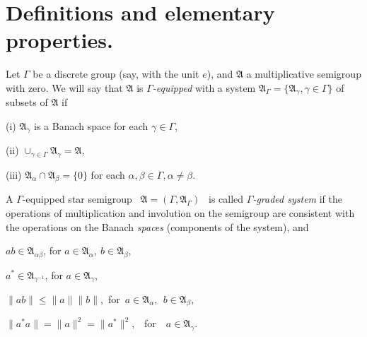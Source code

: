 \documentclass[
11pt,%
tightenlines,%
twoside,%
onecolumn,%
nofloats,%
nobibnotes,%
nofootinbib,%
superscriptaddress,%
noshowpacs,%
centertags]%
{revtex4}
\begin{document}
\section{Definitions and elementary properties.}

Let  $\Gamma$  be a discrete group (say, with the unit   $e$), and   $\mathfrak A$    a multiplicative semigroup with zero. We will say that
 $\mathfrak A$  is   {\em $\Gamma$-equipped} with a system   $\mathfrak A_\Gamma  = \{\mathfrak A_\gamma, \gamma\in\Gamma\}$   of subsets of  $\mathfrak A$  if

\medskip(i) $\mathfrak A_\gamma$  is a Banach space for each  $\gamma\in\Gamma$,

\medskip(ii) $\cup_{\gamma\in\Gamma}{\mathfrak A_\gamma} = {\mathfrak A}$,

\medskip(iii) ${\mathfrak A}_\alpha\cap {\mathfrak A}_\beta  =  \{0\}$ for each $\alpha, \beta\in\Gamma, \alpha\neq\beta$.

\begin{definition}\label{graded-system}  A  $\Gamma$-equipped star semigroup \ ${\mathfrak A} = (\Gamma, {\mathfrak A}_\Gamma)$ \ is called {\em $\Gamma$-graded system}
if the operations of multiplication and involution on the semigroup are consistent with the operations on the Banach {\em spaces} (components of the system), and

   $ab\in{\mathfrak A}_{\alpha \beta}$,    for $a\in    {\mathfrak  A}_\alpha,\   b\in {\mathfrak   A}_\beta,$

  $a^*\in {\mathfrak A}_{\gamma^{-1}}$,  for  $a \in {\mathfrak   A}_\gamma$,

$\|ab\|\leq \| a \|\|b\|$,\  for\   $a\in  {\mathfrak A}_\alpha, \ \ b\in{\mathfrak A}_\beta,$

 $\| a^*a \| =  \| a \|^2 = \| a^*\|^2$,\ \  for\ \  $a\in\mathfrak A_\gamma$.
\end{definition}
\end{document}
